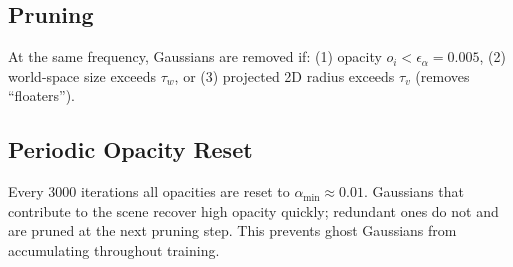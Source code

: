 \subsection{Pruning}

At the same frequency, Gaussians are removed if: (1) opacity
$o_i < \epsilon_\alpha = 0.005$, (2) world-space size exceeds $\tau_w$, or
(3) projected 2D radius exceeds $\tau_v$ (removes ``floaters'').

\subsection{Periodic Opacity Reset}

Every 3000 iterations all opacities are reset to $\alpha_{\min} \approx 0.01$.
Gaussians that contribute to the scene recover high opacity quickly; redundant
ones do not and are pruned at the next pruning step. This prevents ghost
Gaussians from accumulating throughout training.
